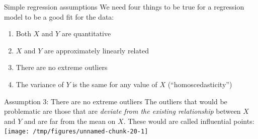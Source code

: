 \documentclass{beamer}\usepackage[]{graphicx}\usepackage[]{color}
\makeatletter
\newcommand{\hlnum}[1]{\textcolor[rgb]{0.824,0.412,0.118}{#1}}%
\newcommand{\hlstr}[1]{\textcolor[rgb]{1,0.894,0.71}{#1}}%
\newcommand{\hlopt}[1]{\textcolor[rgb]{1,0.894,0.769}{#1}}%
\newcommand{\hlstd}[1]{\textcolor[rgb]{1,0.894,0.769}{#1}}%
\newcommand{\hlkwb}[1]{\textcolor[rgb]{0.804,0.776,0.451}{#1}}%
\newcommand{\hlkwc}[1]{\textcolor[rgb]{0.78,0.941,0.545}{#1}}%
\newcommand{\hlkwd}[1]{\textcolor[rgb]{1,0.78,0.769}{#1}}%
\newenvironment{kframe}{%
 \def\at@end@of@kframe{}%
 \ifinner\ifhmode%
  \def\at@end@of@kframe{\end{minipage}}%
  \begin{minipage}{\columnwidth}%
 \fi\fi%
 \def\FrameCommand##1{\hskip\@totalleftmargin \hskip-\fboxsep
 \colorbox{shadecolor}{##1}\hskip-\fboxsep
     \hskip-\linewidth \hskip-\@totalleftmargin \hskip\columnwidth}%
 \MakeFramed {\advance\hsize-\width
   \@totalleftmargin\z@ \linewidth\hsize
   \@setminipage}}%
 {\par\unskip\endMakeFramed%
 \at@end@of@kframe}
\newenvironment{knitrout}{}{} %
\makeatother
\begin{document}
\begin{darkframes}

    \begin{frame}{Simple regression assumptions}
      We need four things to be true for a regression model to be a good fit for the data:
      \begin{enumerate}
        \item Both $X$ and $Y$ are quantitative \greencheckmark
        \item $X$ and $Y$ are approximately linearly related \greencheckmark
        \item There are no extreme outliers
        \item The variance of $Y$ is the same for any value of $X$ (``homoscedasticity'')
      \end{enumerate}
    \end{frame}

    \begin{frame}[fragile]{Assumption 3: There are no extreme outliers}
      The outliers that would be problematic are those that are \emph{deviate from the existing relationship} between $X$ and $Y$ and are far from the mean on $X$. These would are called \alert{influential points}:
\begin{knitrout}
\color{fgcolor}
\texttt{[image: /tmp/figures/unnamed-chunk-20-1]} 


\end{knitrout}
\end{frame}
\end{darkframes}
\end{document}
